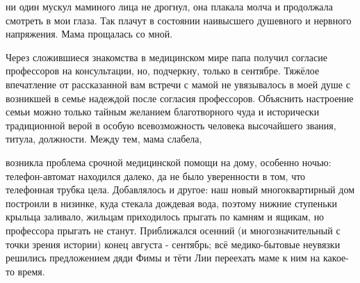 \label{185-1}
ни один мускул маминого лица не дрогнул, она плакала молча и продолжала смотреть в мои глаза. Так плачут в состоянии наивысшего душевного и нервного напряжения. Мама прощалась со мной.

Через сложившиеся знакомства в медицинском мире папа получил согласие профессоров на консультации, но, подчеркну, только в сентябре. Тяжёлое впечатление от рассказанной вам встречи с мамой не увязывалось в моей душе с возникшей в семье надеждой после согласия профессоров. Объяснить настроение семьи можно только тайным желанием благотворного чуда и исторически традиционной верой в особую всевозможность человека высочайшего звания, титула, должности. Между тем, мама слабела,

\label{186-1}
 возникла проблема срочной медицинской помощи на дому, особенно ночью: телефон-автомат находился далеко, да не было уверенности в том, что телефонная трубка цела. Добавлялось и другое: наш новый многоквартирный дом построили в низинке, куда стекала дождевая вода, поэтому нижние ступеньки крыльца заливало, жильцам приходилось прыгать по камням и ящикам, но профессора прыгать не станут. Приближался осенний (и многозначительный с точки зрения истории) конец августа - сентябрь; всё медико-бытовые неувязки решились предложением дяди Фимы и тёти Лии переехать маме к ним на какое-то время.